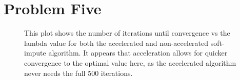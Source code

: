 

\section{Problem Five}

\begin{figure}[h!tbp]
        \caption{This plot shows the number of iterations until convergence vs
        the lambda value for both the accelerated and non-accelerated soft-impute
        algorithm. It appears that acceleration allows for quicker convergence
        to the optimal value here, as the accelerated algorithm never needs
        the full 500 iterations.}
\end{figure}

